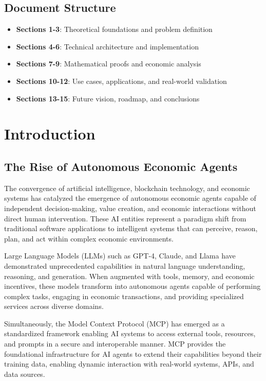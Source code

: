\documentclass[12pt,a4paper]{article}
\begin{document}
\subsection{Document Structure}
\begin{itemize}
\item \textbf{Sections 1-3}: Theoretical foundations and problem definition
\item \textbf{Sections 4-6}: Technical architecture and implementation
\item \textbf{Sections 7-9}: Mathematical proofs and economic analysis
\item \textbf{Sections 10-12}: Use cases, applications, and real-world validation
\item \textbf{Sections 13-15}: Future vision, roadmap, and conclusions
\end{itemize}

\section{Introduction}

\subsection{The Rise of Autonomous Economic Agents}

The convergence of artificial intelligence, blockchain technology, and economic systems has catalyzed the emergence of autonomous economic agents capable of independent decision-making, value creation, and economic interactions without direct human intervention. These AI entities represent a paradigm shift from traditional software applications to intelligent systems that can perceive, reason, plan, and act within complex economic environments.

Large Language Models (LLMs) such as GPT-4, Claude, and Llama have demonstrated unprecedented capabilities in natural language understanding, reasoning, and generation. When augmented with tools, memory, and economic incentives, these models transform into autonomous agents capable of performing complex tasks, engaging in economic transactions, and providing specialized services across diverse domains.

Simultaneously, the Model Context Protocol (MCP) has emerged as a standardized framework enabling AI systems to access external tools, resources, and prompts in a secure and interoperable manner. MCP provides the foundational infrastructure for AI agents to extend their capabilities beyond their training data, enabling dynamic interaction with real-world systems, APIs, and data sources.
\end{document}
